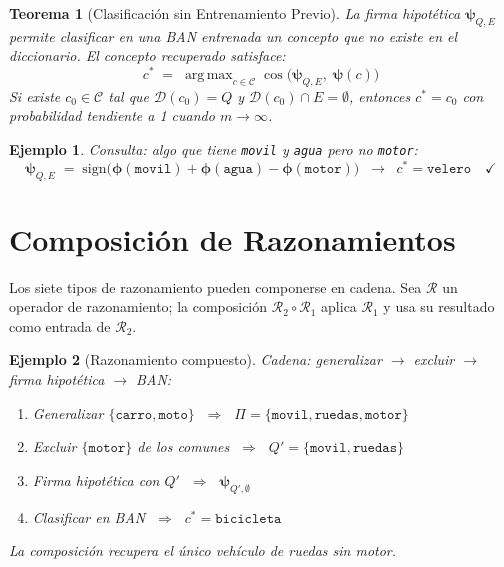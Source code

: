 \documentclass[12pt]{article}
\newtheorem{theorem}{Teorema}[section]
\newtheorem{example}{Ejemplo}[section]
\begin{document}
\begin{theorem}[Clasificación sin Entrenamiento Previo]
	La firma hipotética $\bm{\psi}_{Q,E}$ permite clasificar en una BAN entrenada
	un concepto que no existe en el diccionario. El concepto recuperado satisface:
	\[
	c^* \;=\; \operatorname{arg\,max}_{c \in \mathcal{C}}
	\cos\!\bigl(\bm{\psi}_{Q,E},\;\bm{\psi}(c)\bigr)
	\]
	Si existe $c_0 \in \mathcal{C}$ tal que $\mathcal{D}(c_0) = Q$ y
	$\mathcal{D}(c_0) \cap E = \emptyset$, entonces $c^* = c_0$ con probabilidad
	tendiente a 1 cuando $m \to \infty$.
\end{theorem}

\begin{example}
	Consulta: algo que tiene \texttt{movil} y \texttt{agua} pero no \texttt{motor}:
	\[
	\bm{\psi}_{Q,E} \;=\;
	\mathrm{sign}\!\bigl(\bm{\phi}(\texttt{movil})
	+ \bm{\phi}(\texttt{agua})
	- \bm{\phi}(\texttt{motor})\bigr)
	\;\;\longrightarrow\;\; c^* = \texttt{velero} \quad\checkmark
	\]
\end{example}

\section{Composición de Razonamientos}

Los siete tipos de razonamiento pueden componerse en cadena.
Sea $\mathcal{R}$ un operador de razonamiento; la composición
$\mathcal{R}_2 \circ \mathcal{R}_1$ aplica $\mathcal{R}_1$ y usa
su resultado como entrada de $\mathcal{R}_2$.

\begin{example}[Razonamiento compuesto]
	Cadena: generalizar $\to$ excluir $\to$ firma hipotética $\to$ BAN:
	\begin{enumerate}[leftmargin=*]
		\item Generalizar $\{\texttt{carro},\texttt{moto}\}$
		$\;\Rightarrow\;$ $\Pi = \{\texttt{movil},\texttt{ruedas},\texttt{motor}\}$
		\item Excluir $\{\texttt{motor}\}$ de los comunes
		$\;\Rightarrow\;$ $Q' = \{\texttt{movil},\texttt{ruedas}\}$
		\item Firma hipotética con $Q'$
		$\;\Rightarrow\;$ $\bm{\psi}_{Q',\emptyset}$
		\item Clasificar en BAN
		$\;\Rightarrow\;$ $c^* = \texttt{bicicleta}$ \quad\checkmark
	\end{enumerate}
	La composición recupera el único vehículo de ruedas sin motor.
\end{example}
\end{document}

